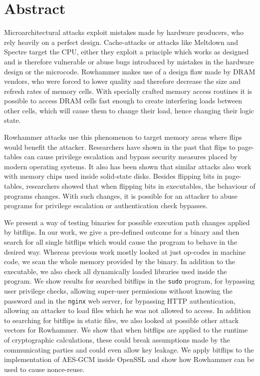 
{}
\chapter*{Abstract}
\label{cha:abstract}

Microarchitectural attacks exploit mistakes made by hardware producers, who rely
heavily on a perfect design. Cache-attacks or attacks like Meltdown and Spectre
target the CPU, either they exploit a principle which works as designed and is
therefore vulnerable or abuse bugs introduced by mistakes in the hardware
design or the microcode. Rowhammer makes use of a design flaw made by DRAM
vendors, who were forced to lower quality and therefore decrease the size and
refresh rates of memory cells. With specially crafted memory access routines it
is possible to access DRAM cells fast enough to create interfering loads between
other cells, which will cause them to change their load, hence changing their
logic state.

Rowhammer attacks use this phenomenon to target memory areas where flips would
benefit the attacker. Researchers have shown in the past that flips to
page-tables can cause privilege escalation and bypass security measures placed
by modern operating systems. It also has been shown that similar attacks also
work with memory chips used inside solid-state disks. Besides flipping bits in
page-tables, researchers showed that when flipping bits in executables, the
behaviour of programs changes. With such changes, it is possible for an attacker
to abuse programs for privilege escalation or authentication check bypasses.

We present a way of testing binaries for possible execution path changes applied
by bitflips. In our work, we give a pre-defined outcome for a binary and then
search for all single bitflips which would cause the program to behave in the
desired way. Whereas previous work mostly looked at just op-codes in machine
code, we scan the whole memory provided by the binary. In addition to the
executable, we also check all dynamically loaded libraries used inside the
program. We show results for searched bitflips in the \texttt{sudo} program, for
bypassing user privilege checks, allowing super-user permissions without knowing
the password and in the \texttt{nginx} web server, for bypassing HTTP
authentication, allowing an attacker to load files which he was not allowed to
access. In addition to searching for bitflips in static files, we also looked at
possible other attack vectors for Rowhammer. We show that when bitflips are
applied to the runtime of cryptographic calculations, these could break
assumptions made by the communicating parties and could even allow key leakage.
We apply bitflips to the implementation of AES-GCM inside OpenSSL and show how
Rowhammer can be used to cause nonce-reuse.

